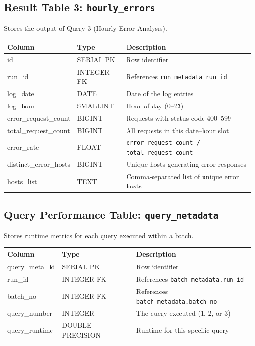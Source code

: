 \documentclass[11pt,a4paper]{article}
\begin{document}
\subsection{Result Table 3: \texttt{hourly\_errors}}

Stores the output of Query 3 (Hourly Error Analysis).

\begin{schematable}
\begin{tabularx}{\linewidth}{@{} >{\ttfamily\small}l >{\small}l X @{}}
\toprule
\textnormal{\textbf{Column}} & \textbf{Type} & \textbf{Description} \\
\midrule
id                    & SERIAL PK  & Row identifier \\
run\_id               & INTEGER FK & References \texttt{run\_metadata.run\_id} \\
log\_date             & DATE       & Date of the log entries \\
log\_hour             & SMALLINT   & Hour of day (0--23) \\
error\_request\_count  & BIGINT     & Requests with status code 400--599 \\
total\_request\_count  & BIGINT     & All requests in this date--hour slot \\
error\_rate           & FLOAT      & \texttt{error\_request\_count / total\_request\_count} \\
distinct\_error\_hosts & BIGINT     & Unique hosts generating error responses \\
hosts\_list           & TEXT       & Comma-separated list of unique error hosts \\
\bottomrule
\end{tabularx}
\end{schematable}

\subsection{Query Performance Table: \texttt{query\_metadata}}

Stores runtime metrics for each query executed within a batch.

\begin{schematable}
\begin{tabularx}{\linewidth}{@{} >{\ttfamily\small}l >{\small}l X @{}}
\toprule
\textnormal{\textbf{Column}} & \textbf{Type} & \textbf{Description} \\
\midrule
query\_meta\_id  & SERIAL PK  & Row identifier \\
run\_id         & INTEGER FK & References \texttt{batch\_metadata.run\_id} \\
batch\_no       & INTEGER FK & References \texttt{batch\_metadata.batch\_no} \\
query\_number   & INTEGER    & The query executed (1, 2, or 3) \\
query\_runtime  & DOUBLE PRECISION & Runtime for this specific query \\
\bottomrule
\end{tabularx}
\end{schematable}
\end{document}
